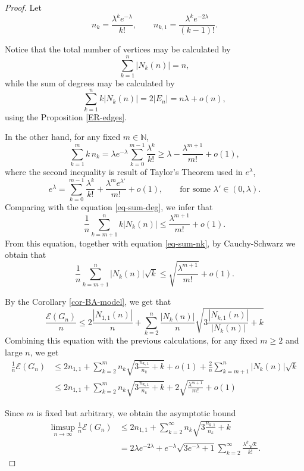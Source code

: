 \documentclass[a4paper]{article}
\newcommand{\N}{\mathbb{N}}
\newcommand{\abs}[1]{\left\lvert#1\right\rvert}
\newcommand{\energy}[1]{\mathcal{E}\left(#1\right)}
\theoremstyle{plain}
\begin{document}
\begin{proof}
Let
\[
    n_k = \frac{\lambda^ke^{-\lambda}}{k!}, \qquad n_{k,1} = \frac{\lambda^ke^{-2\lambda}}{(k-1)!}.
\]

Notice that the total number of vertices may be calculated by
\begin{equation}\label{eq-sum-nk}
    \sum_{k = 1}^n \abs{N_k(n)} = n,
\end{equation}
while the sum of degrees may be calculated by
\begin{equation}\label{eq-sum-deg}
    \sum_{k = 1}^n k \abs{N_k(n)} = 2\abs{E_n} = n\lambda + o(n),
\end{equation}
using the Proposition \ref{ER-edges}.

In the other hand, for any fixed \(m \in \N\),
\[
    \sum_{k = 1}^m k \,n_k = \lambda e^{-\lambda}\sum_{k = 0}^{m-1} \frac{\lambda^k}{k!} \geq \lambda - \frac{\lambda^{m+1}}{m!} + o(1),
\]
where the second inequality is result of Taylor's Theorem used in \(e^{\lambda}\),
\[
    e^{\lambda} = \sum_{k = 0}^{m-1} \frac{\lambda^k}{k!} + \frac{\lambda^m e^{\lambda'}}{m!} + o(1), \qquad \mbox{for some } \lambda' \in (0,\lambda).
\]
Comparing with the equation \eqref{eq-sum-deg}, we infer that
\[
    \frac{1}{n}\sum_{k = m+1}^n k\abs{N_k(n)} \leq \frac{\lambda^{m+1}}{m!} + o(1).
\]
From this equation, together with equation \eqref{eq-sum-nk}, by Cauchy-Schwarz we obtain that
\[
    \frac{1}{n}\sum_{k = m+1}^n \abs{N_k(n)}\sqrt{k} \leq \sqrt{\frac{\lambda^{m+1}}{m!}} + o(1).
\]

By the Corollary \ref{cor-BA-model}, we get that
\[
    \frac{\energy{G_n}}{n} \leq 2\frac{\abs{N_{1,1}(n)}}{n} + \sum_{k = 2}^n \frac{\abs{N_k(n)}}{n} \sqrt{3 \frac{\abs{N_{k,1}(n)}}{\abs{N_k(n)}} + k}
\]
Combining this equation with the previous calculations, for any fixed \(m \geq 2\) and large \(n\), we get
\begin{align*}
    \frac{1}{n}\energy{G_n} &\leq 2n_{1,1} + \sum_{k = 2}^m n_k\sqrt{3\frac{n_{k,1}}{n_k} + k} + o(1) + \frac{2}{n}\sum_{k = m+1}^n \abs{N_k(n)}\sqrt{k}\\
    &\leq 2n_{1,1} + \sum_{k = 2}^m n_k\sqrt{3\frac{n_{k,1}}{n_k} + k} + 2\sqrt{\frac{\lambda^{m+1}}{m!}} + o(1)
\end{align*}

Since \(m\) is fixed but arbitrary, we obtain the asymptotic bound
\begin{align*}
    \limsup_{n \to \infty} \frac{1}{n}\energy{G_n} &\leq 2n_{1,1} + \sum_{k = 2}^{\infty} n_k\sqrt{3\frac{n_{k,1}}{n_k} + k}\\
    &= 2\lambda e^{-2\lambda} + e^{-\lambda}\sqrt{3e^{-\lambda} + 1}\sum_{k = 2}^{\infty} \frac{\lambda^k\sqrt{k}}{k!}.
\end{align*}
    
\end{proof}
\end{document}
